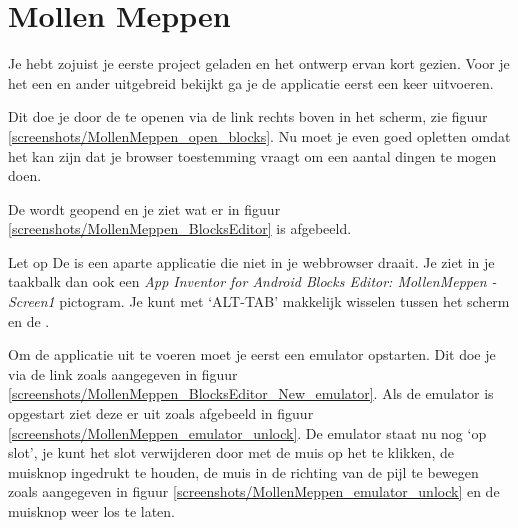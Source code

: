 \chapter{Mollen Meppen}

Je hebt zojuist je eerste project geladen en het ontwerp ervan kort gezien. Voor je het een en ander uitgebreid bekijkt ga je de applicatie eerst een keer uitvoeren.

Dit doe je door de  te openen via de  link rechts boven in het scherm, zie figuur \ref{screenshots/MollenMeppen_open_blocks}. Nu moet je even goed opletten omdat het kan zijn dat je browser toestemming vraagt om een aantal dingen te mogen doen.

De  wordt geopend en je ziet wat er in figuur \ref{screenshots/MollenMeppen_BlocksEditor} is afgebeeld.


\begin{derivation}{Let op}
De  is een aparte applicatie die niet in je webbrowser draait. Je ziet in je taakbalk dan ook een \emph{App Inventor for Android Blocks Editor: MollenMeppen - Screen1} pictogram. Je kunt met `ALT-TAB' makkelijk wisselen tussen het  scherm en de .
\end{derivation}

Om de applicatie uit te voeren moet je eerst een emulator opstarten. Dit doe je via de  link zoals aangegeven in figuur \ref{screenshots/MollenMeppen_BlocksEditor_New_emulator}. Als de emulator is opgestart ziet deze er uit zoals afgebeeld in figuur \ref{screenshots/MollenMeppen_emulator_unlock}. De emulator staat nu nog `op slot', je kunt het slot verwijderen door met de muis op het  te klikken, de muisknop ingedrukt te houden, de muis in de richting van de pijl te bewegen zoals aangegeven in figuur \ref{screenshots/MollenMeppen_emulator_unlock} en de muisknop weer los te laten.

